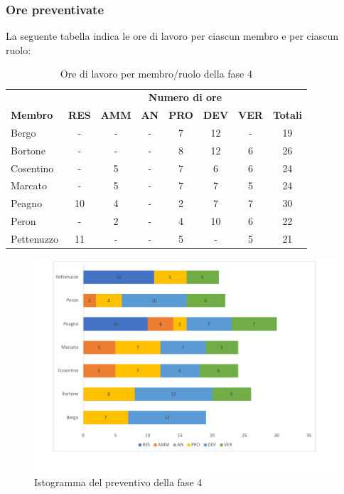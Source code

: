 	\subsubsection{Ore preventivate}
		La seguente tabella indica le ore di lavoro per ciascun membro e per ciascun ruolo:
		\begin{table}[H]
			\centering
			\begin{tabular}{| l | c c c c c c | c |}
				\rowcolor{LightBlue}
				& \multicolumn{7}{c}{\textbf{\color{white}Numero di ore}}	\\
		
				\rowcolor{LightBlue}
				\textbf{\color{white}Membro}
				& \textbf{\color{white}RES}
				& \textbf{\color{white}AMM}
				& \textbf{\color{white}AN}
				& \textbf{\color{white}PRO}
				& \textbf{\color{white}DEV}
				& \textbf{\color{white}VER}
				& \textbf{\color{white}Totali}\\
	
				Bergo      & - & - & - & 7 & 12 & - & 19\\
				Bortone    & - & - & - & 8 & 12 & 6 & 26\\
				Cosentino  & - & 5 & - & 7 & 6 & 6 & 24\\
				Marcato    & - & 5 & - & 7 & 7 & 5 & 24\\
				Peagno     & 10 & 4 & - & 2 & 7 & 7 & 30\\
				Peron      & - & 2 & - & 4 & 10 & 6 & 22\\
				Pettenuzzo & 11 & - & - & 5 & - & 5 & 21\\ \hline
			\end{tabular}
			\caption{Ore di lavoro per membro/ruolo della fase 4}
		\end{table}
		
	\begin{figure}[h]
	\centering
	\includegraphics[scale=0.45]{images/preventivoRA.pdf}
	\caption{Istogramma del preventivo della fase 4}
\end{figure}
		
